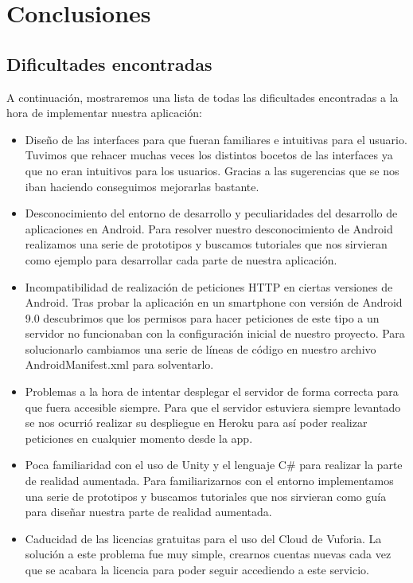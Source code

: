 \section{Conclusiones}
\label{makereference4.8}
\subsection{Dificultades encontradas}
\label{makereference4.8.1}
A continuación, mostraremos una lista de todas las dificultades encontradas a la hora de implementar nuestra aplicación:
\begin{itemize}
    \item Diseño de las interfaces para que fueran familiares e intuitivas para el usuario. Tuvimos que rehacer muchas veces los distintos bocetos de las interfaces ya que no eran intuitivos para los usuarios. Gracias a las sugerencias que se nos iban haciendo conseguimos mejorarlas bastante.
    \item Desconocimiento del entorno de desarrollo y peculiaridades del desarrollo de aplicaciones en Android. Para resolver nuestro desconocimiento de Android realizamos una serie de prototipos y buscamos tutoriales que nos sirvieran como ejemplo para desarrollar cada parte de nuestra aplicación.
    \item Incompatibilidad de realización de peticiones HTTP en ciertas versiones de Android. Tras probar la aplicación en un smartphone con versión de Android 9.0 descubrimos que los permisos para hacer peticiones de este tipo a un servidor no funcionaban con la configuración inicial de nuestro proyecto. Para solucionarlo cambiamos una serie de líneas de código en nuestro archivo AndroidManifest.xml para solventarlo.
    \item Problemas a la hora de intentar desplegar el servidor de forma correcta para que fuera accesible siempre. Para que el servidor estuviera siempre levantado se nos ocurrió realizar su despliegue en Heroku para así poder realizar peticiones en cualquier momento desde la app.
    \item Poca familiaridad con el uso de Unity y el lenguaje C\# para realizar la parte de realidad aumentada. Para familiarizarnos con el entorno implementamos una serie de prototipos y buscamos tutoriales que nos sirvieran como guía para diseñar nuestra parte de realidad aumentada. 
    \item Caducidad de las licencias gratuitas para el uso del Cloud de Vuforia. La solución a este problema fue muy simple, crearnos cuentas nuevas cada vez que se acabara la licencia para poder seguir accediendo a este servicio.

\end{itemize}
